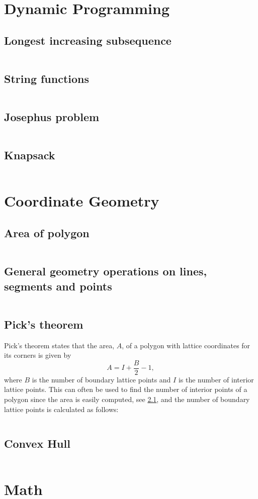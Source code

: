 \documentclass[8pt,a4paper,landscape,oneside]{amsart}
\newcommand{\codep}[1]{\inputminted[fontsize=\large,tabsize=2,baselinestretch=1]{py}{code/#1}}
\begin{document}
\begin{multicols*}{2}
\begin{large}
\section{Dynamic Programming}
\subsection{Longest increasing subsequence}
\codep{lis.py}
\subsection{String functions}
\codep{stringmatching.py}
\subsection{Josephus problem}
\codep{josephus.py}
\subsection{Knapsack}
\codep{knapsack.py}
\section{Coordinate Geometry}
\subsection{Area of polygon}\label{sec: polyarea}
\codep{polygonArea.py}
\subsection{General geometry operations on lines, segments and points}
\codep{geometry.py}
\subsection{Pick's theorem}
Pick's theorem states that the area, $A$, of a polygon with lattice coordinates for its corners is given by $$A=I+\frac{B}{2}-1,$$ where $B$ is the number of boundary lattice points and $I$ is the number of interior lattice points. This can often be used to find the number of interior points of a polygon since the area is easily computed, see \ref{sec: polyarea}, and the number of boundary lattice points is calculated as follows:
\codep{boundarypoints.py}
\subsection{Convex Hull}
\codep{convexhull.py}
\section{Math}

\end{large}
\end{multicols*}
\end{document}
